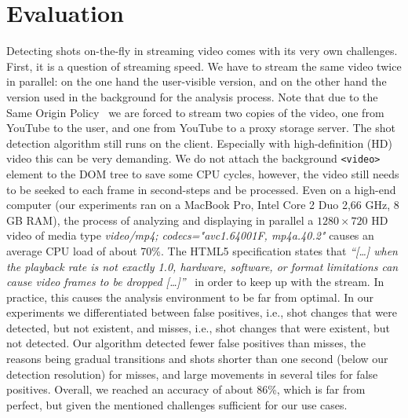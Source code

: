 \documentclass{acm_proc_article-sp}
\begin{document}

\section{Evaluation} \label{sec:evaluation}
Detecting shots on-the-fly in streaming video comes with its very own challenges. First, it is a question of streaming speed. We have to stream the same video twice in parallel: on the one hand the user-visible version, and on the other hand the version used in the background for the analysis process. Note that due to the Same Origin Policy~\cite{sameoriginpolicy} we are forced to stream two copies of the video, one from YouTube to the user, and one from YouTube to a proxy storage server. The shot detection algorithm still runs on the client. Especially with high-definition (HD) video this can be very demanding. We do not attach the background \texttt{<video>} element to the DOM tree to save some CPU cycles, however, the video still needs to be seeked to each frame in second-steps and be processed. Even on a high-end computer (our experiments ran on a MacBook Pro, Intel Core 2 Duo 2,66 GHz, 8 GB RAM), the process of analyzing and displaying in parallel a $\mathit{1280} \times \mathit{720}$ HD video of media type \emph{video/mp4; codecs="avc1.64001F, mp4a.40.2"} causes an average CPU load of about 70\%. The HTML5 specification states that \textit{``[\ldots] when the playback rate is not exactly 1.0, hardware, software, or format limitations can cause video frames to be dropped [\ldots]''}~\cite{whatwgvideo} in order to keep up with the stream. In practice, this causes the analysis environment to be far from optimal. In our experiments we differentiated between false positives, i.e., shot changes that were detected, but not existent, and misses, i.e., shot changes that were existent, but not detected. Our algorithm detected fewer false positives than misses, the reasons being gradual transitions and shots shorter than one second (below our detection resolution) for misses, and large movements in several tiles for false positives. Overall, we reached an accuracy of about 86\%, which is far from perfect, but given the mentioned challenges sufficient for our use cases. 
\end{document}
